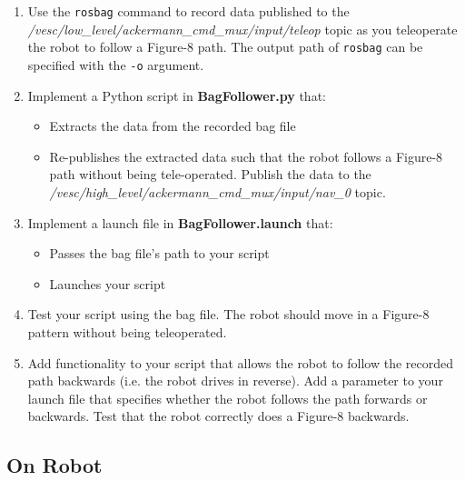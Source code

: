 \documentclass[final]{article}
\begin{document}
\begin{enumerate}
\item Use the \texttt{rosbag} command to record data published to the \textit{/vesc/low\_level/ackermann\_cmd\_mux/input/teleop} topic as you teleoperate the robot to follow a Figure-8 path. The output path of \texttt{rosbag} can be specified with the \texttt{-o} argument.
\item Implement a Python script in \textbf{BagFollower.py} that: 
	\begin{itemize}
    	\item Extracts the data from the recorded bag file
        \item Re-publishes the extracted data such that the robot follows a Figure-8 path without being tele-operated. Publish the data to the \textit{/vesc/high\_level/ackermann\_cmd\_mux/input/nav\_0} topic.
    \end{itemize}
\item Implement a launch file in \textbf{BagFollower.launch} that:
	\begin{itemize}
    	\item Passes the bag file's path to your script
        \item Launches your script
    \end{itemize}
    \item Test your script using the bag file. The robot should move in a Figure-8 pattern without being teleoperated. %
    \item Add functionality to your script that allows the robot to follow the recorded path backwards (i.e. the robot drives in reverse). Add a parameter to your launch file that specifies whether the robot follows the path forwards or backwards. Test that the robot correctly does a Figure-8 backwards.
\end{enumerate}

\subsection{On Robot}
\end{document}

